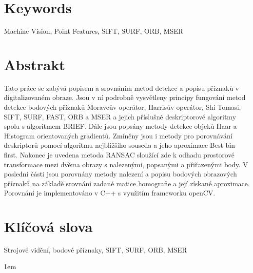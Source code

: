 \documentclass{bakalarka}
\begin{document}
{\let\clearpage\relax\chapter*{Keywords}}
Machine Vision, Point Features, SIFT, SURF, ORB, MSER

\chapter*{Abstrakt}
\thispagestyle{empty}
Tato práce se zabývá popisem a srovnáním metod detekce a popisu příznaků v digitalizovaném obraze. Jsou v ní podrobně vysvětleny principy fungování metod detekce bodových příznaků Moravcův operátor, Harrisův operátor, Shi-Tomasi, SIFT, SURF, FAST, ORB a MSER a jejich příslušné deskriptorové algoritmy spolu s algoritmem BRIEF. Dále jsou popsány metody detekce objeků Haar a Histogram orientovaných gradientů. Zmíněny jsou i metody pro porovnávání deskriptorů pomocí algoritmu nejbližšího souseda a jeho aproximace Best bin first. Nakonec je uvedena metoda RANSAC sloužící zde k odhadu prostorové transformace mezi dvěma obrazy s nalezenými, popsanými a přiřazenými body. V poslední části jsou porovnány metody nalezení a popisu bodových obrazových příznaků na základě srovnání zadané matice homografie a její získané aproximace. Porovnání je implementováno v C++ s využitím frameworku openCV.

{\let\clearpage\relax\chapter*{Klíčová slova}}
Strojové vidění, bodové příznaky, SIFT, SURF, ORB, MSER


\tableofcontents
\pagestyle{fancy}
\renewcommand{\chaptermark}[1]{\markboth{\textit{#1}}{}}
\renewcommand{\sectionmark}[1]{\markright{\textit{#1}}{}}
\cfoot{\thepage}
\lhead{\leftmark}
\rhead{\rightmark}
\parskip 1em


 








\appendix
\listoffigures


\end{document}
